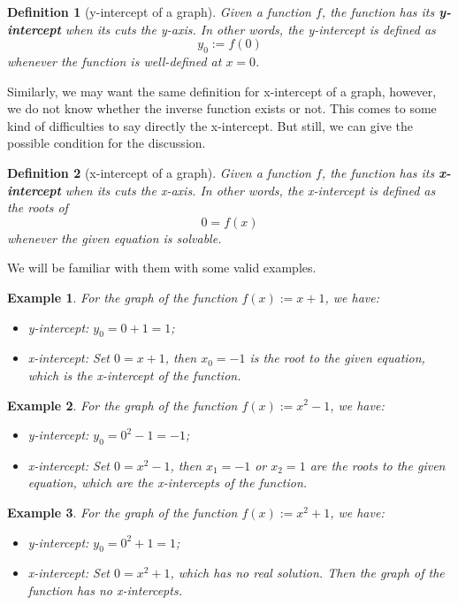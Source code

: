 \documentclass[12pt]{article}
\newtheorem{definition}{Definition}[section]
\newtheorem*{example}{Example}
\begin{document}
    \begin{definition}[y-intercept of a graph]
        Given a function $f$, the function has its \textbf{y-intercept} when its cuts the y-axis. In other words, the y-intercept is defined as $$y_0:=f(0)$$ whenever the function is well-defined at $x=0$.
    \end{definition}

    Similarly, we may want the same definition for x-intercept of a graph, however, we do not know whether the inverse function exists or not. This comes to some kind of difficulties to say directly the x-intercept. But still, we can give the possible condition for the discussion.

    \begin{definition}[x-intercept of a graph]
        Given a function $f$, the function has its \textbf{x-intercept} when its cuts the x-axis. In other words, the x-intercept is defined as the roots of $$0=f(x)$$ whenever the given equation is solvable.
    \end{definition}

    We will be familiar with them with some valid examples.

    \begin{example}
        For the graph of the function $f(x):=x+1$, we have:\begin{itemize}
            \item y-intercept: $y_0=0+1=1$;
            \item x-intercept: Set $0=x+1$, then $x_0=-1$ is the root to the given equation, which is the x-intercept of the function.
        \end{itemize}
    \end{example}

    \begin{example}
        For the graph of the function $f(x):=x^2-1$, we have:\begin{itemize}
            \item y-intercept: $y_0=0^2-1=-1$;
            \item x-intercept: Set $0=x^2-1$, then $x_1=-1$ or $x_2=1$ are the roots to the given equation, which are the x-intercepts of the function.
        \end{itemize}
    \end{example}

    \begin{example}
        For the graph of the function $f(x):=x^2+1$, we have:\begin{itemize}
            \item y-intercept: $y_0=0^2+1=1$;
            \item x-intercept: Set $0=x^2+1$, which has no real solution. Then the graph of the function has no x-intercepts.
        \end{itemize}
    \end{example}
\end{document}
